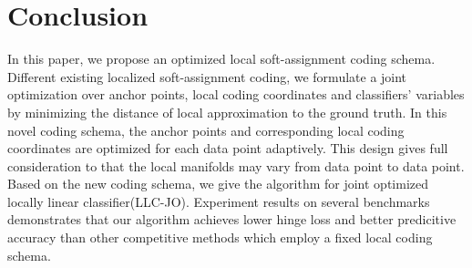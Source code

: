 \documentclass{llncs}
\begin{document}
	\section{Conclusion}
	In this paper, we propose an optimized local soft-assignment coding schema. Different existing localized soft-assignment coding, we formulate a joint optimization over anchor points, local coding coordinates and classifiers' variables by minimizing the distance of local approximation to the ground truth. In this novel coding schema, the anchor points and corresponding local coding coordinates are optimized for each data point adaptively. This design gives full consideration to that the local manifolds may vary from data point to data point.  Based on the new coding schema, we give the algorithm for joint optimized locally linear classifier(LLC-JO). Experiment results on several benchmarks demonstrates that our algorithm achieves lower hinge loss and better predicitive accuracy than other competitive methods which employ a fixed local coding schema.
\end{document}
